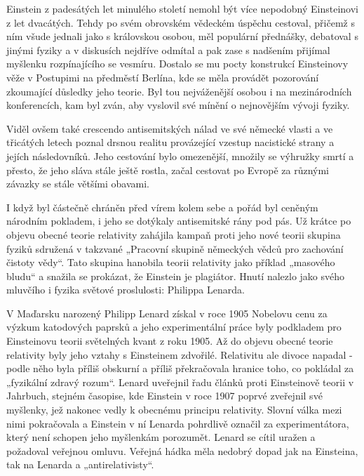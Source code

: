   Einstein z padesátých let minulého století nemohl být více nepodobný Einsteinovi z let dvacátých.
  Tehdy po svém obrovském vědeckém úspěchu cestoval, přičemž s ním všude jednali jako s královskou
  osobou, měl populární přednášky, debatoval s jinými fyziky a v diskusích nejdříve odmítal a pak
  zase s nadšením přijímal myšlenku rozpínajícího se vesmíru. Dostalo se mu pocty konstrukcí
  Einsteinovy věže v Postupimi na předměstí Berlína, kde se měla provádět pozorování zkoumající
  důsledky jeho teorie. Byl tou nejváženější osobou i na mezinárodních konferencích, kam byl zván,
  aby vyslovil své mínění o nejnovějším vývoji fyziky. 
  
  Viděl ovšem také crescendo antisemitských nálad ve své německé vlasti a ve třicátých letech poznal
  drsnou realitu provázející vzestup nacistické strany a jejích následovníků. Jeho cestování bylo
  omezenější, množily se výhružky smrtí a přesto, že jeho sláva stále ještě rostla, začal cestovat
  po Evropě za různými závazky se stále většími obavami. 
  
  I když byl částečně chráněn před vírem kolem sebe a pořád byl ceněným národním pokladem, i jeho se
  dotýkaly antisemitské rány pod pás. Už krátce po objevu obecné teorie relativity zahájila kampaň
  proti jeho nové teorii skupina fyziků sdružená v takzvané „Pracovní skupině německých vědců pro
  zachování čistoty vědy“. Tato skupina hanobila teorii relativity jako příklad „masového bludu“ a
  snažila se prokázat, že Einstein je plagiátor. Hnutí nalezlo jako svého mluvčího i fyzika světové
  proslulosti: Philippa Lenarda. 
  
  V Maďarsku narozený Philipp Lenard získal v roce 1905 Nobelovu cenu za výzkum katodových paprsků a
  jeho experimentální práce byly podkladem pro Einsteinovu teorii světelných kvant z roku 1905. Až
  do objevu obecné teorie relativity byly jeho vztahy s Einsteinem zdvořilé. Relativitu ale divoce
  napadal - podle něho byla příliš obskurní a příliš překračovala hranice toho, co pokládal za
  „fyzikální zdravý rozum“. Lenard uveřejnil řadu článků proti Einsteinově teorii v Jahrbuch,
  stejném časopise, kde Einstein v roce 1907 poprvé zveřejnil své myšlenky, jež nakonec vedly k
  obecnému principu relativity. Slovní válka mezi nimi pokračovala a Einstein v ní Lenarda pohrdlivě
  označil za experimentátora, který není schopen jeho myšlenkám porozumět. Lenard se cítil uražen a
  požadoval veřejnou omluvu. Veřejná hádka měla nedobrý dopad jak na Einsteina, tak na Lenarda a
  „antirelativisty“. 
  
